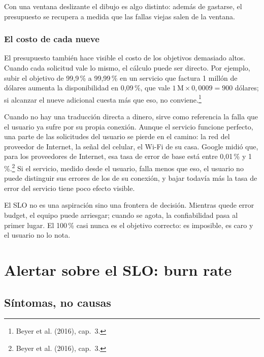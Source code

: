 \documentclass[variant=apuntes,cover=institutional,mode=screen]{ua-engineering-v6-article}
\begin{document}
Con una ventana deslizante el dibujo es algo distinto: además de gastarse, el presupuesto se recupera a medida que las fallas viejas salen de la ventana.

\subsubsection{El costo de cada nueve}

El presupuesto también hace visible el costo de los objetivos demasiado altos. Cuando cada solicitud vale lo mismo, el cálculo puede ser directo. Por ejemplo, subir el objetivo de 99,9\,\% a 99,99\,\% en un servicio que factura 1 millón de dólares aumenta la disponibilidad en 0,09\,\%, que vale $1\,\text{M} \times 0{,}0009 = 900$ dólares; si alcanzar el nueve adicional cuesta más que eso, no conviene.\footnote{Beyer et al. (2016), cap.~3.}

Cuando no hay una traducción directa a dinero, sirve como referencia la falla que el usuario ya sufre por su propia conexión. Aunque el servicio funcione perfecto, una parte de las solicitudes del usuario se pierde en el camino: la red del proveedor de Internet, la señal del celular, el Wi-Fi de su casa. Google midió que, para los proveedores de Internet, esa tasa de error de base está entre 0,01\,\% y 1\,\%.\footnote{Beyer et al. (2016), cap.~3.} Si el servicio, medido desde el usuario, falla menos que eso, el usuario no puede distinguir sus errores de los de su conexión, y bajar todavía más la tasa de error del servicio tiene poco efecto visible.

\begin{uakeybox}
El SLO no es una aspiración sino una frontera de decisión. Mientras quede error budget, el equipo puede arriesgar; cuando se agota, la confiabilidad pasa al primer lugar. El 100\,\% casi nunca es el objetivo correcto: es imposible, es caro y el usuario no lo nota.
\end{uakeybox}

\section{Alertar sobre el SLO: burn rate}\label{sec:burn}

\subsection{Síntomas, no causas}\label{sec:sintomas}
\end{document}

